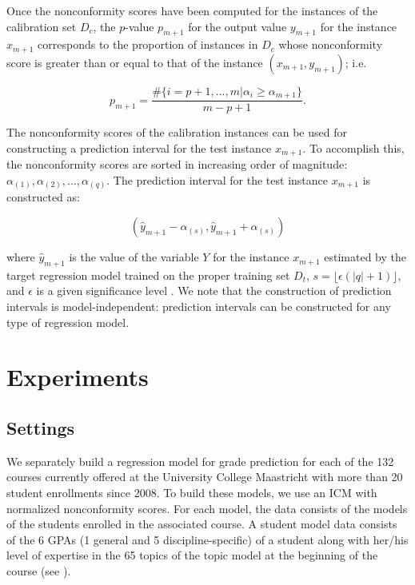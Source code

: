 \documentclass[pmlr]{jmlr}%
\begin{document}
Once the nonconformity scores have been computed for the instances of the calibration set $D_c$, the $p$-value $p_{m+1}$ for the output value $y_{m+1}$ for the instance $x_{m+1}$ corresponds to the proportion of instances in $D_c$ whose nonconformity score is greater than or equal to that of the instance $(x_{m+1},y_{m+1})$; i.e.

\begin{equation}
\label{eq:e3}
p_{m+1} = \frac{\#\{i= p+1,...,m|\alpha_i \geq \alpha_{m+1}\} }{m - p +1}. 
\end{equation}

The nonconformity scores of the calibration instances can be used for constructing a prediction interval for the test instance $x_{m+1}$. To accomplish this, the nonconformity scores are sorted in increasing order of magnitude: $ \alpha_{(1)}, \alpha_{(2)}, \ldots, \alpha_{(q)}$. The prediction interval for the test instance $x_{m+1}$ is constructed as:

\begin{equation}
\label{eq:e4}
(\hat{y}_{m+1} - \alpha_{(s)} , \hat{y}_{m+1} + \alpha_{(s)})
\end{equation}

\noindent where  $\hat{y}_{m+1} $  is the value of the variable $Y$ for the instance $x_{m+1}$ estimated by the target regression model trained on the proper training set $D_t$, $s = \lfloor \epsilon (|q|+1) \rfloor$, and $\epsilon$ is a given significance level \citep{Papadopoulos.2011}. We note that the construction of prediction intervals is model-independent: prediction intervals can be constructed for any type of regression model.

\section{Experiments}
\label{sec:experiment}

\subsection{Settings}

We separately build a regression model for grade prediction for each of the 132 courses currently offered at the University College Maastricht with more than 20 student enrollments since 2008. To build these models, we use an ICM with normalized nonconformity scores. For each model, the data consists of the  models of the students enrolled in the associated course. A student model data consists of the 6 GPAs (1 general and 5 discipline-specific) of a student along with her/his level of expertise in the 65 topics of the topic model at the beginning of the course (see ).
\end{document}

